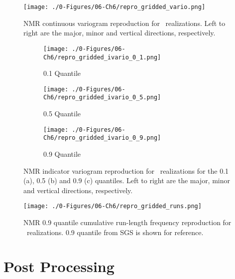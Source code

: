 \begin{figure}[htb!]
    \centering
    \texttt{[image: ./0-Figures/06-Ch6/repro\_gridded\_vario.png]}
    \caption{\gls{NMR} continuous variogram reproduction for \csnreals \ realizations. Left to right are the major, minor and vertical directions, respectively.}
    \label{fig:repro_gridded_vario}
\end{figure}

\begin{figure}
    \begin{subfigure}{1.0\textwidth}
        \centering
        \texttt{[image: ./0-Figures/06-Ch6/repro\_gridded\_ivario\_0\_1.png]}
        \caption{0.1 Quantile}
    \end{subfigure}
    \begin{subfigure}{1.0\textwidth}
        \centering
        \texttt{[image: ./0-Figures/06-Ch6/repro\_gridded\_ivario\_0\_5.png]}
        \caption{0.5 Quantile}
    \end{subfigure}
    \begin{subfigure}{1.0\textwidth}
        \centering
        \texttt{[image: ./0-Figures/06-Ch6/repro\_gridded\_ivario\_0\_9.png]}
        \caption{0.9 Quantile}
    \end{subfigure}
    \caption{\gls{NMR} indicator variogram reproduction for \csnreals \ realizations for the 0.1 (a), 0.5 (b) and 0.9 (c) quantiles. Left to right are the major, minor and vertical directions, respectively.}
    \label{fig:repro_gridded_ivario}
\end{figure}

\begin{figure}[htb!]
    \centering
    \texttt{[image: ./0-Figures/06-Ch6/repro\_gridded\_runs.png]}
    \caption{\gls{NMR} 0.9 quantile cumulative run-length frequency reproduction for \csnreals \ realizations. 0.9 quantile from \gls{SGS} is shown for reference.}
    \label{fig:repro_gridded_runs}
\end{figure}


\FloatBarrier
\section{Post Processing}
\label{sec:post}

